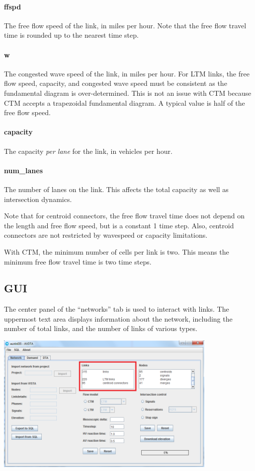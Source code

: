 \paragraph*{ffspd} The free flow speed of the link, in miles per hour. Note that the free flow travel time is rounded up to the nearest time step.
\paragraph*{w} The congested wave speed of the link, in miles per hour. For LTM links, the free flow speed, capacity, and congested wave speed must be consistent as the fundamental diagram is over-determined. This is not an issue with CTM because CTM accepts a trapezoidal fundamental diagram. A typical value is half of the free flow speed.
\paragraph*{capacity} The capacity \textit{per lane} for the link, in vehicles per hour.
\paragraph*{num\_lanes} The number of lanes on the link. This affects the total capacity as well as intersection dynamics.

Note that for centroid connectors, the free flow travel time does not depend on the length and free flow speed, but is a constant 1 time step. Also, centroid connectors are not restricted by wavespeed or capacity limitations. 

With CTM, the minimum number of cells per link is two. This means the minimum free flow travel time is two time steps.

\subsection{GUI}

The center panel of the ``networks'' tab is used to interact with links. The uppermost text area displays information about the network, including the number of total links, and the number of links of various types.
\begin{center}
\includegraphics[width=0.8\textwidth]{images/links1.png}
\end{center}

